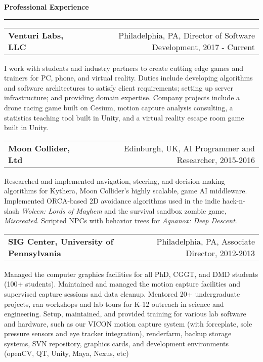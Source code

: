 \needspace{6em}
{\Large {\bf Professional Experience}} 
\vspace{0.1cm}
\hrule
\medskip

\needspace{6em}
\begin{tabular*}{7.1in}{@{}l@{\extracolsep\fill}r}
{\large {\bf Venturi Labs, LLC}} & Philadelphia, PA, Director of Software Development, 2017 - Current\\
\end{tabular*}

I work with students and industry partners to create cutting edge games and trainers for PC, phone, and virtual reality. Duties include developing algorithms and software architectures to satisfy client requirements; setting up server infrastructure; and providing domain expertise. Company projects include a drone racing game built on Cesium, motion capture analysis consulting, a statistics teaching tool built in Unity, and a virtual reality escape room game built in Unity. 

\medskip
\medskip

\needspace{6em}
\begin{tabular*}{7.1in}{@{}l@{\extracolsep\fill}r}
{\large {\bf Moon Collider, Ltd}} & Edinburgh, UK, AI Programmer and Researcher, 2015-2016\\
\end{tabular*}

Researched and implemented navigation, steering, and decision-making algorithms for Kythera, Moon Collider's highly 
scalable, game AI middleware. Implemented ORCA-based 2D avoidance algorithms used in the indie hack-n-slash \emph{Wolcen: Lords of Mayhem} and the survival sandbox zombie game, \emph{Miscreated}. Scripted NPCs with behavior trees for \emph{Aquanox: Deep Descent}.

\medskip
\medskip

\needspace{6em}
\begin{tabular*}{7.1in}{@{}l@{\extracolsep\fill}r}
{\large {\bf SIG Center, University of Pennsylvania}} & Philadelphia, PA, Associate Director, 2012-2013\\
\end{tabular*}

Managed the computer graphics facilities for all PhD, CGGT, and DMD students (100+ students). Maintained and managed the motion capture facilities and supervised capture sessions and data cleanup. Mentored 20+ undergraduate projects, ran workshops and lab tours for K-12 outreach in science and engineering. Setup, maintained, and provided training for various lab software and hardware, such as our VICON motion capture system (with forceplate, sole pressure sensors and eye tracker integration), renderfarm, backup storage systems, SVN repository, graphics cards, and development environments (openCV, QT, Unity, Maya, Nexus, etc)


